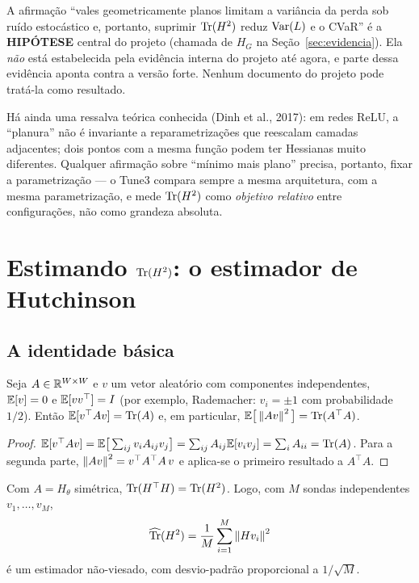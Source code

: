 \begin{alerta}
A afirmação ``vales geometricamente planos limitam a variância da perda sob ruído estocástico e, portanto, suprimir $\operatorname{Tr}(H^2)$ reduz $\operatorname{Var}(L)$ e o CVaR'' é a \textbf{HIPÓTESE} central do projeto (chamada de $H_G$ na Seção~\ref{sec:evidencia}). Ela \emph{não} está estabelecida pela evidência interna do projeto até agora, e parte dessa evidência aponta contra a versão forte. Nenhum documento do projeto pode tratá-la como resultado.
\end{alerta}

Há ainda uma ressalva teórica conhecida (Dinh et al., 2017): em redes ReLU, a ``planura'' não é invariante a reparametrizações que reescalam camadas adjacentes; dois pontos com a mesma função podem ter Hessianas muito diferentes. Qualquer afirmação sobre ``mínimo mais plano'' precisa, portanto, fixar a parametrização --- o Tune3 compara sempre a mesma arquitetura, com a mesma parametrização, e mede $\operatorname{Tr}(H^2)$ como \emph{objetivo relativo} entre configurações, não como grandeza absoluta.

\section{Estimando \texorpdfstring{$\operatorname{Tr}(H^2)$}{Tr(H²)}: o estimador de Hutchinson}\label{sec:hutchinson}

\subsection{A identidade básica}
\begin{proposicao}[Hutchinson, 1990]\label{prop:hutch}
Seja $A\in\mathbb{R}^{W\times W}$ e $v$ um vetor aleatório com componentes independentes, $\mathbb{E}[v]=0$ e $\mathbb{E}[vv^\top]=I$ (por exemplo, Rademacher: $v_i=\pm1$ com probabilidade $1/2$). Então $\mathbb{E}[v^\top A v]=\operatorname{Tr}(A)$ e, em particular, $\mathbb{E}\big[\left\lVert Av \right\rVert^2\big]=\operatorname{Tr}(A^\top A)$.
\end{proposicao}
\begin{proof}
$\mathbb{E}[v^\top A v]=\mathbb{E}\big[\sum_{ij}v_iA_{ij}v_j\big]=\sum_{ij}A_{ij}\mathbb{E}[v_iv_j]=\sum_i A_{ii}=\operatorname{Tr}(A)$. Para a segunda parte, $\left\lVert Av \right\rVert^2=v^\top A^\top A\,v$ e aplica-se o primeiro resultado a $A^\top A$.
\end{proof}
Com $A=H_\theta$ simétrica, $\operatorname{Tr}(H^\top H)=\operatorname{Tr}(H^2)$. Logo, com $M$ sondas independentes $v_1,\dots,v_M$,
\begin{equation}\label{eq:hutch}
\widehat{\operatorname{Tr}}(H^2)=\frac1M\sum_{i=1}^M\left\lVert H v_i \right\rVert^2
\end{equation}
é um estimador não-viesado, com desvio-padrão proporcional a $1/\sqrt M$.

